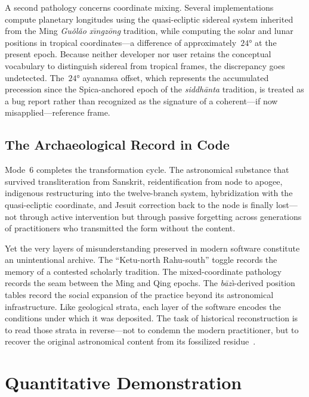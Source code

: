 \documentclass[10pt,a4paper]{article}
\providecommand{\degree}{\ensuremath{°}}
\begin{document}
A second pathology concerns coordinate mixing.  Several implementations compute
planetary longitudes using the quasi-ecliptic sidereal system
inherited from the Ming \textit{Gu\v{o}l\v{a}o x\={\i}ngz\={o}ng} tradition, while computing the solar and
lunar positions in tropical coordinates---a difference of approximately~$24\degree$
at the present epoch.  Because neither developer nor user retains the conceptual
vocabulary to distinguish sidereal from tropical frames, the discrepancy goes
undetected.  The~$24\degree$ ayanamsa offset, which represents the accumulated
precession since the Spica-anchored epoch of the \textit{siddh\=anta} tradition,
is treated as a bug report rather than recognized as the signature of a
coherent---if now misapplied---reference frame.

\subsection*{The Archaeological Record in Code}

Mode~6 completes the transformation cycle.  The astronomical substance that
survived transliteration from Sanskrit, reidentification from node to apogee,
indigenous restructuring into the twelve-branch system, hybridization with the
quasi-ecliptic coordinate, and Jesuit correction back to the node is finally
lost---not through active intervention but through passive forgetting across
generations of practitioners who transmitted the form without the content.

Yet the very layers of misunderstanding preserved in modern software constitute
an unintentional archive.  The ``Ketu-north Rahu-south'' toggle records the memory of a
contested scholarly tradition.  The mixed-coordinate pathology records the
seam between the Ming and Qing epochs.  The \textit{b\={a}z\`{\i}}-derived position tables
record the social expansion of the practice beyond its astronomical
infrastructure.  Like geological strata, each layer of the software encodes the
conditions under which it was deposited.  The task of historical reconstruction
is to read those strata in reverse---not to condemn the modern practitioner, but
to recover the original astronomical content from its fossilized
residue~\cite{mak2014pseudoplanets}.

\section{Quantitative Demonstration}\label{sec:computation}
\end{document}
